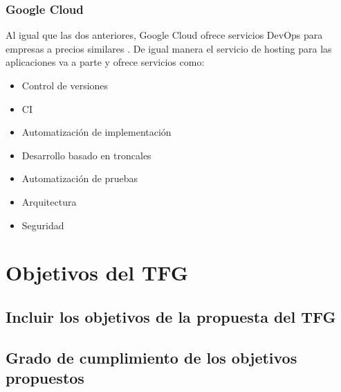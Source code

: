 		\subsubsection{Google Cloud}
			\begin{paragraph}
				Al igual que las dos anteriores, Google Cloud ofrece servicios DevOps para empresas a precios similares \cite{GoogleCloud:online}. De igual manera el servicio de hosting para las aplicaciones va a parte y ofrece servicios como:
				\begin{itemize}
					\item Control de versiones
					\item CI
					\item Automatización de implementación
					\item Desarrollo basado en troncales
					\item Automatización de pruebas
					\item Arquitectura
					\item Seguridad
				\end{itemize}
			\end{paragraph}	
	
\section{Objetivos del TFG}
	\subsection{Incluir los objetivos de la propuesta del TFG}
	\subsection{Grado de cumplimiento de los objetivos propuestos}







